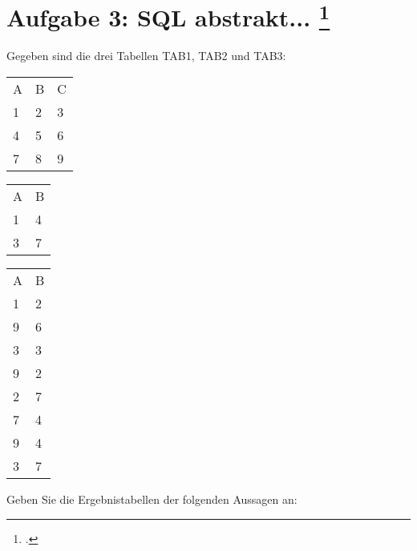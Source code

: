\documentclass{lehramt-informatik-aufgabe}
\begin{document}

\section{Aufgabe 3: SQL abstrakt...
\footcite{db:ab:3}
}

Gegeben sind die drei Tabellen TAB1, TAB2 und TAB3:


\begin{tabular}{lll}
A&B&C\\
1&2&3\\
4&5&6\\
7&8&9\\
\end{tabular}


\begin{tabular}{ll}
A&B\\
1&4\\
3&7\\
\end{tabular}


\begin{tabular}{ll}
A&B\\
1&2\\
9&6\\
3&3\\
9&2\\
2&7\\
7&4\\
9&4\\
3&7\\
\end{tabular}

\bigskip

Geben Sie die Ergebnistabellen der folgenden Aussagen an:
\end{document}
